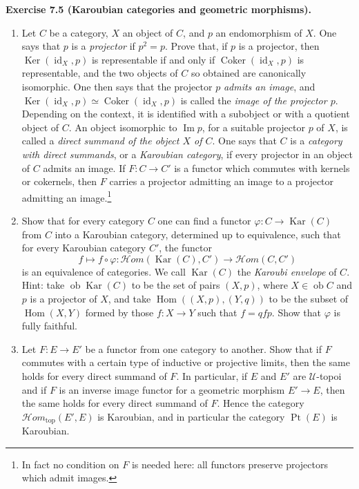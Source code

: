 \documentclass[11pt]{article}
\newcommand{\U}{\mathcal{U}}
\newcommand{\Hom}{\operatorname{Hom}}
\newcommand{\ob}{\operatorname{ob}}
\newcommand{\id}{\operatorname{id}}
\newcommand{\Ker}{\operatorname{Ker}}
\newcommand{\Coker}{\operatorname{Coker}}
\newcommand{\im}{\operatorname{Im}}
\newcommand{\kar}{\operatorname{Kar}}
\newcommand{\Ppoint}{\operatorname{Pt}}
\newcommand{\Hhom}{\mathcal{H}om}
\newcommand{\Hhomtop}{\mathcal{H}om_{\mathrm{top}}}
\newenvironment{remarktext}[1]{\par\medskip\noindent\textbf{#1.}\ }{\par\medskip}
\begin{document}
\begin{remarktext}{Exercise 7.5 (Karoubian categories and geometric morphisms)}
\begin{enumerate}[label=\alph*)]
\item Let \(C\) be a category, \(X\) an object of \(C\), and \(p\) an endomorphism of \(X\). One says that \(p\) is a \emph{projector} if \(p^2=p\). Prove that, if \(p\) is a projector, then \(\Ker(\id_X,p)\) is representable if and only if \(\Coker(\id_X,p)\) is representable, and the two objects of \(C\) so obtained are canonically isomorphic. One then says that the projector \(p\) \emph{admits an image}, and \(\Ker(\id_X,p)\simeq\Coker(\id_X,p)\) is called the \emph{image of the projector \(p\)}. Depending on the context, it is identified with a subobject or with a quotient object of \(C\). An object isomorphic to \(\im p\), for a suitable projector \(p\) of \(X\), is called a \emph{direct summand of the object \(X\) of \(C\)}. One says that \(C\) is a \emph{category with direct summands}, or a \emph{Karoubian category}, if every projector in an object of \(C\) admits an image. If \(F:C\to C'\) is a functor which commutes with kernels or cokernels, then \(F\) carries a projector admitting an image to a projector admitting an image.\footnote{In fact no condition on \(F\) is needed here: all functors preserve projectors which admit images.}

\item Show that for every category \(C\) one can find a functor \(\varphi:C\to\kar(C)\) from \(C\) into a Karoubian category, determined up to equivalence, such that for every Karoubian category \(C'\), the functor
\[
f\longmapsto f\circ\varphi:\Hhom(\kar(C),C')\longrightarrow\Hhom(C,C')
\]
is an equivalence of categories. We call \(\kar(C)\) the \emph{Karoubi envelope} of \(C\). Hint: take \(\ob\kar(C)\) to be the set of pairs \((X,p)\), where \(X\in\ob C\) and \(p\) is a projector of \(X\), and take \(\Hom((X,p),(Y,q))\) to be the subset of \(\Hom(X,Y)\) formed by those \(f:X\to Y\) such that \(f=qfp\). Show that \(\varphi\) is fully faithful.

\item Let \(F:E\to E'\) be a functor from one category to another. Show that if \(F\) commutes with a certain type of inductive or projective limits, then the same holds for every direct summand of \(F\). In particular, if \(E\) and \(E'\) are \(\U\)-topoi and if \(F\) is an inverse image functor for a geometric morphism \(E'\to E\), then the same holds for every direct summand of \(F\). Hence the category \(\Hhomtop(E',E)\) is Karoubian, and in particular the category \(\Ppoint(E)\) is Karoubian.


\end{enumerate}
\end{remarktext}
\end{document}
